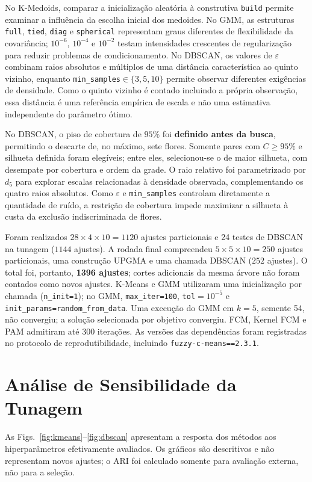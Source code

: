 \documentclass[conference,a4paper]{IEEEtran}
\begin{document}
No K-Medoids, comparar a inicialização aleatória à construtiva \texttt{build} permite examinar a influência da escolha inicial dos medoides. No GMM, as estruturas \texttt{full}, \texttt{tied}, \texttt{diag} e \texttt{spherical} representam graus diferentes de flexibilidade da covariância; $10^{-6}$, $10^{-4}$ e $10^{-2}$ testam intensidades crescentes de regularização para reduzir problemas de condicionamento. No DBSCAN, os valores de $\varepsilon$ combinam raios absolutos e múltiplos de uma distância característica ao quinto vizinho, enquanto \texttt{min\_samples}$\in\{3,5,10\}$ permite observar diferentes exigências de densidade. Como o quinto vizinho é contado incluindo a própria observação, essa distância é uma referência empírica de escala e não uma estimativa independente do parâmetro ótimo.

No DBSCAN, o piso de cobertura de $95\%$ foi \textbf{definido antes da busca}, permitindo o descarte de, no máximo, sete flores. Somente pares com $C\geq 95\%$ e silhueta definida foram elegíveis; entre eles, selecionou-se o de maior silhueta, com desempate por cobertura e ordem da grade. O raio relativo foi parametrizado por $d_5$ para explorar escalas relacionadas à densidade observada, complementando os quatro raios absolutos. Como $\varepsilon$ e \texttt{min\_samples} controlam diretamente a quantidade de ruído, a restrição de cobertura impede maximizar a silhueta à custa da exclusão indiscriminada de flores.

Foram realizados $28\times4\times10=1120$ ajustes particionais e 24 testes de DBSCAN na tunagem ($1144$ ajustes). A rodada final compreendeu $5\times5\times10=250$ ajustes particionais, uma construção UPGMA e uma chamada DBSCAN ($252$ ajustes). O total foi, portanto, \textbf{1396 ajustes}; cortes adicionais da mesma árvore não foram contados como novos ajustes. K-Means e GMM utilizaram uma inicialização por chamada (\texttt{n\_init=1}); no GMM, \texttt{max\_iter=100}, \texttt{tol}$=10^{-5}$ e \texttt{init\_params=random\_from\_data}. Uma execução do GMM em $k=5$, semente 54, não convergiu; a solução selecionada por objetivo convergiu. FCM, Kernel FCM e PAM admitiram até 300 iterações. As versões das dependências foram registradas no protocolo de reprodutibilidade, incluindo \texttt{fuzzy-c-means==2.3.1}.

\section{Análise de Sensibilidade da Tunagem}
As Figs.~\ref{fig:kmeans}--\ref{fig:dbscan} apresentam a resposta dos métodos aos hiperparâmetros efetivamente avaliados. Os gráficos são descritivos e não representam novos ajustes; o ARI foi calculado somente para avaliação externa, não para a seleção.
\end{document}
